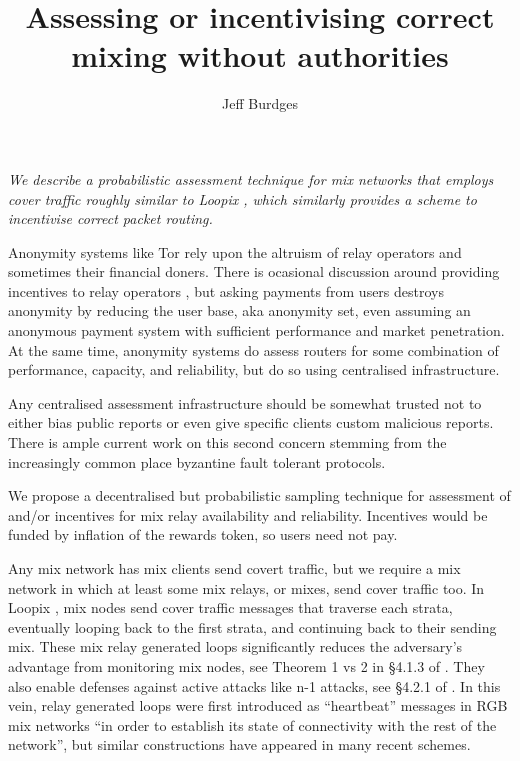 ﻿\documentclass{sig-alternate-hotpets}
\title{Assessing or incentivising correct mixing without authorities} %
\author{Jeff Burdges}
\date{}
\begin{document}
\maketitle

\begin{adjustwidth}{6pt}{8pt}
\it
We describe a probabilistic assessment technique for %
mix networks that employs cover traffic roughly similar to
Loopix \cite{Loopix}, which similarly provides a scheme to
incentivise correct packet routing.
\end{adjustwidth}
\medskip

Anonymity systems like Tor %
rely upon the altruism of relay operators and sometimes their financial doners.
There is ocasional discussion around providing incentives to relay operators \cite{TorPathToTorCoin}, 
but asking payments from users destroys anonymity by reducing the user base, aka anonymity set, even assuming an anonymous payment system with sufficient performance and market penetration.  
At the same time, anonymity systems do assess routers for some combination of performance, capacity, and reliability, but do so using centralised infrastructure. 

Any centralised assessment infrastructure should be somewhat trusted not to either bias public reports or even give specific clients custom malicious reports.  There is ample current work on this second concern stemming from the increasingly common place byzantine fault tolerant protocols.

We propose a decentralised but probabilistic sampling technique for assessment of and/or incentives for mix relay availability and reliability.  
Incentives would be funded by inflation of the rewards token, so users need not pay.

Any mix network has mix clients send covert traffic, but we require a mix network in which at least some mix relays, or mixes, send cover traffic too.  
In Loopix \cite{Loopix}, mix nodes send cover traffic messages that traverse each strata, eventually looping back to the first strata, and continuing back to their sending mix.  
These mix relay generated loops significantly reduces the adversary's advantage from monitoring mix nodes, see Theorem 1 vs 2 in \S4.1.3 of \cite{Loopix}.  %
They also enable defenses against active attacks like n-1 attacks, see \S4.2.1 of \cite{Loopix}.  %
In this vein, relay generated loops were first introduced as ``heartbeat'' messages in RGB mix networks \cite{RGB_Heartbeat} ``in order to establish its state of connectivity with the rest of the network'', but similar constructions have appeared in many recent schemes.
\end{document}
